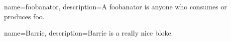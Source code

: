 {   name={foobanator},
    description={A foobanator is anyone who consumes or produces foo.}
}


{   name={Barrie},
    description={Barrie is a really nice bloke.}
}
